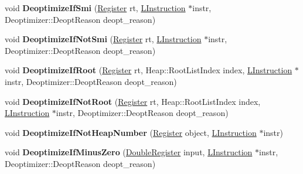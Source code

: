 \begin{DoxyCompactItemize}
\item 
void {\bfseries Deoptimize\+If\+Smi} (\hyperlink{structv8_1_1internal_1_1_register}{Register} rt, \hyperlink{classv8_1_1internal_1_1_l_instruction}{L\+Instruction} $\ast$instr, Deoptimizer\+::\+Deopt\+Reason deopt\+\_\+reason)\hypertarget{classv8_1_1internal_1_1_l_code_gen_aeadc419f7add5eab5b24cfdd4d4d4a28}{}\label{classv8_1_1internal_1_1_l_code_gen_aeadc419f7add5eab5b24cfdd4d4d4a28}

\item 
void {\bfseries Deoptimize\+If\+Not\+Smi} (\hyperlink{structv8_1_1internal_1_1_register}{Register} rt, \hyperlink{classv8_1_1internal_1_1_l_instruction}{L\+Instruction} $\ast$instr, Deoptimizer\+::\+Deopt\+Reason deopt\+\_\+reason)\hypertarget{classv8_1_1internal_1_1_l_code_gen_ae084c990c24b0f63b43280d8e8ed1ac8}{}\label{classv8_1_1internal_1_1_l_code_gen_ae084c990c24b0f63b43280d8e8ed1ac8}

\item 
void {\bfseries Deoptimize\+If\+Root} (\hyperlink{structv8_1_1internal_1_1_register}{Register} rt, Heap\+::\+Root\+List\+Index index, \hyperlink{classv8_1_1internal_1_1_l_instruction}{L\+Instruction} $\ast$instr, Deoptimizer\+::\+Deopt\+Reason deopt\+\_\+reason)\hypertarget{classv8_1_1internal_1_1_l_code_gen_adf773fc91103fbd716824059a5271156}{}\label{classv8_1_1internal_1_1_l_code_gen_adf773fc91103fbd716824059a5271156}

\item 
void {\bfseries Deoptimize\+If\+Not\+Root} (\hyperlink{structv8_1_1internal_1_1_register}{Register} rt, Heap\+::\+Root\+List\+Index index, \hyperlink{classv8_1_1internal_1_1_l_instruction}{L\+Instruction} $\ast$instr, Deoptimizer\+::\+Deopt\+Reason deopt\+\_\+reason)\hypertarget{classv8_1_1internal_1_1_l_code_gen_a9f7d016a74e06f75f9e3d925fed952c2}{}\label{classv8_1_1internal_1_1_l_code_gen_a9f7d016a74e06f75f9e3d925fed952c2}

\item 
void {\bfseries Deoptimize\+If\+Not\+Heap\+Number} (\hyperlink{structv8_1_1internal_1_1_register}{Register} object, \hyperlink{classv8_1_1internal_1_1_l_instruction}{L\+Instruction} $\ast$instr)\hypertarget{classv8_1_1internal_1_1_l_code_gen_a3775230d9d4b225e2782f1c509b6d61e}{}\label{classv8_1_1internal_1_1_l_code_gen_a3775230d9d4b225e2782f1c509b6d61e}

\item 
void {\bfseries Deoptimize\+If\+Minus\+Zero} (\hyperlink{structv8_1_1internal_1_1_double_register}{Double\+Register} input, \hyperlink{classv8_1_1internal_1_1_l_instruction}{L\+Instruction} $\ast$instr, Deoptimizer\+::\+Deopt\+Reason deopt\+\_\+reason)\hypertarget{classv8_1_1internal_1_1_l_code_gen_a813bc108c43c8f86d0fa83ea971638a0}{}\label{classv8_1_1internal_1_1_l_code_gen_a813bc108c43c8f86d0fa83ea971638a0}


\end{DoxyCompactItemize}
